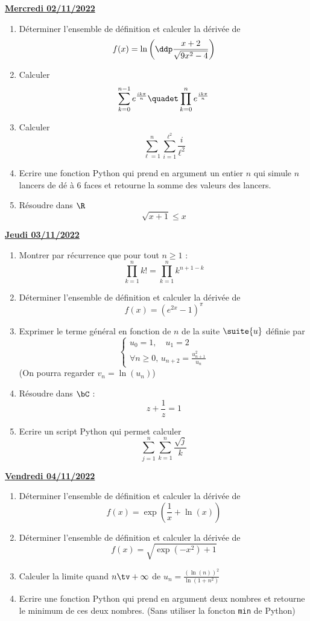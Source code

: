 \documentclass[a4paper, 11pt,reqno]{article}
\newcommand{\jour}[1]{
\begin{center}
\underline{\textbf{#1}}
\end{center}

 }
\begin{document}
\jour{Mercredi 02/11/2022}
\begin{exercice}
\begin{enumerate}
\item  Déterminer l'ensemble de définition et calculer la dérivée de
$$f(x)=\ln{\left(  \ddp\frac{x+2}{\sqrt{9x^2-4}} \right)}$$

\item  Calculer $$\sum_{k=0}^{n-1} e^{\frac{ik\pi}{n} }\quadet \prod_{k=0}^{n} e^{\frac{ik\pi}{n} }$$
\item  Calculer 
$$\sum_{\ell=1}^{n} \sum_{i=1}^{\ell^2}\frac{i}{\ell^2}$$
\item Ecrire une fonction Python qui prend en argument un entier $n$ qui simule $n$ lancers de dé à 6 faces et retourne la somme des valeurs des lancers. 
\item Résoudre dans $\R$
$$\sqrt{x+1}\leq x$$
\end{enumerate}
\end{exercice}

\jour{Jeudi 03/11/2022}


\begin{exercice}
\begin{enumerate}
\item  Montrer par récurrence que pour tout $n\geq 1$ :
$$\prod_{k=1}^n k! = \prod_{k=1}^n k^{n+1-k}$$
\item  Déterminer l'ensemble de définition et calculer la dérivée de
$$f(x)=(e^{2x}-1)^{\pi}$$
\item Exprimer le terme général en fonction de $n$ de la suite $\suite{u}$ définie par 
$$\left\{\begin{array}{l}
u_0 =1, \quad u_1=2\\
\forall n\geq 0,\,  u_{n+2}= \frac{u_{n+1}^2}{u_n}
\end{array}\right.$$
(On pourra regarder $v_n=\ln(u_n)$)
\item Résoudre dans $\bC$ : 
$$z+\frac{1}{z}=1$$
\item Ecrire un script Python qui permet calculer 
$$\sum_{j=1}^n\sum_{k=1}^n \frac{\sqrt{j}}{k}$$
\end{enumerate}
\end{exercice}

\jour{Vendredi 04/11/2022}
\begin{exercice}
\begin{enumerate}
\item  Déterminer l'ensemble de définition et calculer la dérivée de
$$f(x)= \exp\left(\frac{1}{x}+\ln(x)\right)$$
\item  Déterminer l'ensemble de définition et calculer la dérivée de
$$f(x) = \sqrt{\exp(-x^2)+1}$$

\item Calculer la limite quand $n\tv+\infty$ de $u_n=\frac{(\ln(n))^2}{\ln(1+n^2)}$
\item Ecrire une fonction Python qui prend en argument deux nombres et retourne le minimum de ces deux nombres. 
(Sans utiliser la foncton \texttt{min} de Python)
\end{enumerate}
\end{exercice}
\end{document}
